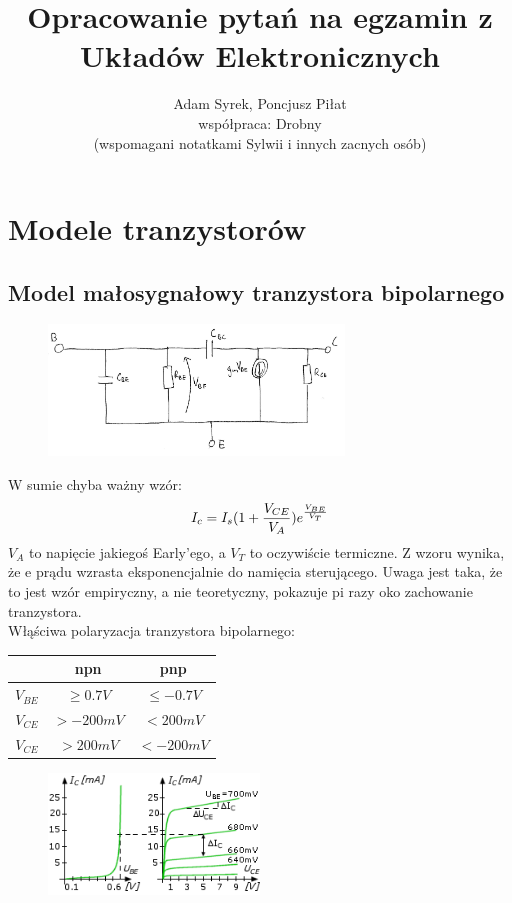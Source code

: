 \documentclass[10pt,a4paper]{article}
\author{Adam Syrek, Poncjusz Piłat \\ współpraca: Drobny \\ (wspomagani notatkami Sylwii i innych zacnych osób)}
\title{Opracowanie pytań na egzamin z Układów Elektronicznych}
\begin{document}
\maketitle

\newpage
\tableofcontents
\newpage
\tableofcontents
\newpage

\section{Modele tranzystorów}
\subsection{Model małosygnałowy tranzystora bipolarnego}
\begin{figure}[H]
\centering
\includegraphics[width=0.7\textwidth]{malosyg_bip.png}
\end{figure}

W sumie chyba ważny wzór:
\begin{equation}
I_c = I_s(1+{V_{CE}\over V_A})e^{V_{BE} \over V_T}
\end{equation}
$V_A$ to napięcie jakiegoś Early'ego, a $V_T$ to oczywiście termiczne. Z wzoru wynika, że 
e prądu wzrasta eksponencjalnie do namięcia sterującego. Uwaga jest taka, że to jest wzór empiryczny, a nie teoretyczny, pokazuje pi razy oko zachowanie tranzystora.\\
Włąściwa polaryzacja tranzystora bipolarnego:
\begin{center}
\begin{tabular}{c|c|c}
& npn & pnp \\
\hline
$V_{BE}$ & $\geq 0.7V$ & $\leq -0.7V$ \\ 

$V_{CE}$ & $> -200mV$ & $< 200mV$\\ 

$V_{CE}$ & $> 200mV$ & $< -200mV$\\ 
\end{tabular}
\end{center}

\begin{figure}[H]
\centering
\includegraphics[width=0.5\textwidth]{char.png}
\end{figure}
\end{document}
